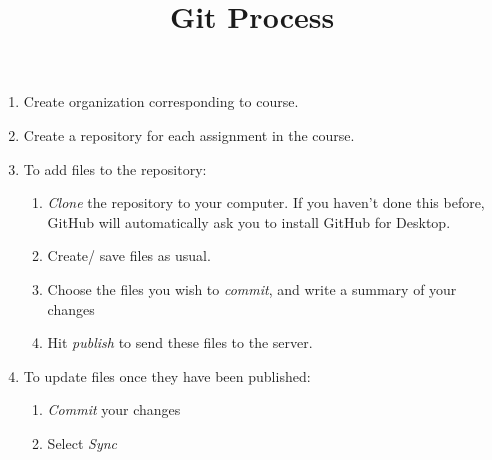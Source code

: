 \documentclass[12pt]{amsart}
\title{Git Process}
\theoremstyle{definition}
\begin{document}
\pagestyle{plain}


\maketitle

\begin{enumerate}
\item Create organization corresponding to course.
\item Create a repository for each assignment in the course.
\item To add files to the repository:
\begin{enumerate}
\item \emph{Clone} the repository to your computer.  If you haven't done this before, GitHub will automatically ask you to install GitHub for Desktop.
\item Create/ save files as usual.
\item Choose the files you wish to \emph{commit}, and write a summary of your changes
\item Hit \emph{publish} to send these files to the server.
\end{enumerate}
\item To update files once they have been published:
\begin{enumerate}
\item \emph{Commit} your changes
\item Select \emph{Sync}
\end{enumerate}
\end{enumerate}
\end{document}

